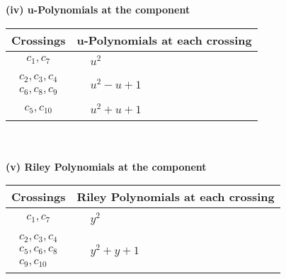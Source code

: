 \documentclass[1p]{elsarticle_modified}
\theoremstyle{definition}
\begin{document}
\newpage\renewcommand{\arraystretch}{1}
\flushleft \textbf{(iv) u-Polynomials at the component}\newline \\
\begin{tabular}{m{50pt}|m{274pt}}
Crossings & \hspace{64pt}u-Polynomials at each crossing \\
\hline $$\begin{aligned}c_{1},c_{7}\end{aligned}$$&$\begin{aligned}
&u^2
\end{aligned}$\\
\hline $$\begin{aligned}c_{2},c_{3},c_{4}\\c_{6},c_{8},c_{9}\end{aligned}$$&$\begin{aligned}
&u^2- u+1
\end{aligned}$\\
\hline $$\begin{aligned}c_{5},c_{10}\end{aligned}$$&$\begin{aligned}
&u^2+u+1
\end{aligned}$\\
\hline
\end{tabular}\\~\\
\newpage\renewcommand{\arraystretch}{1}
\flushleft \textbf{(v) Riley Polynomials at the component}\newline \\
\begin{tabular}{m{50pt}|m{274pt}}
Crossings & \hspace{64pt}Riley Polynomials at each crossing \\
\hline $$\begin{aligned}c_{1},c_{7}\end{aligned}$$&$\begin{aligned}
&y^2
\end{aligned}$\\
\hline $$\begin{aligned}c_{2},c_{3},c_{4}\\c_{5},c_{6},c_{8}\\c_{9},c_{10}\end{aligned}$$&$\begin{aligned}
&y^2+y+1
\end{aligned}$\\
\hline
\end{tabular}\\~\\
\end{document}
